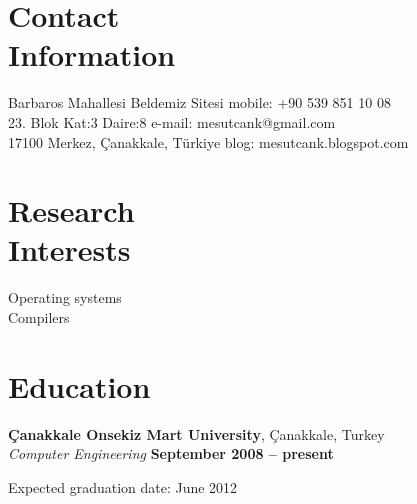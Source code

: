 \documentclass[margin,line]{resume}
\begin{document}
\begin{resume}

    \section{\mysidestyle Contact\\Information}

    Barbaros Mahallesi Beldemiz Sitesi                            \hfill  mobile: +90 539 851 10 08              \vspace{0mm}\\\vspace{0mm}%
    23. Blok Kat:3 Daire:8                          \hfill  e-mail: mesutcank@gmail.com    \vspace{0mm}\\\vspace{0mm}%
    17100 Merkez, Çanakkale, Türkiye      \hfill  blog: mesutcank.blogspot.com        \vspace{0mm}\\\vspace{-4.5mm}%


    \section{\mysidestyle Research\\Interests}

    Operating systems \\
    Compilers \\


    \section{\mysidestyle Education}


    \textbf{Çanakkale Onsekiz Mart University}, Çanakkale, Turkey \vspace{2mm}\\\vspace{1mm}%
    \textsl{Computer Engineering} \hfill \textbf{ September 2008 -- present}\vspace{-3mm}\\\vspace{-1mm}%
    \begin{list2}
        \item Expected graduation date: June 2012
    \end{list2}\vspace{-1.5mm}


\end{resume}
\end{document}
